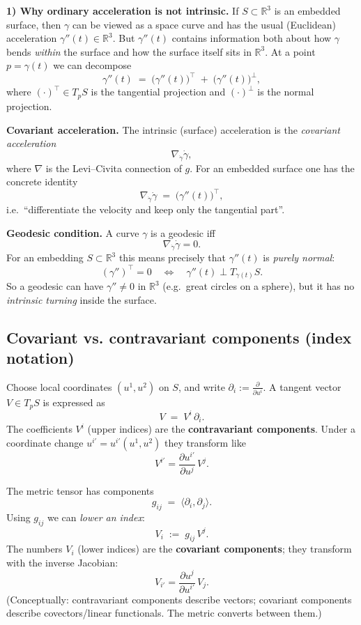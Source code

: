 \documentclass[12pt,a4paper]{article}
\theoremstyle{plain}
\theoremstyle{definition}      %
\begin{document}
\medskip
\textbf{1) Why ordinary acceleration is not intrinsic.}
If $S\subset \mathbb{R}^3$ is an embedded surface, then $\gamma$ can be viewed as a space curve and has the usual
(Euclidean) acceleration $\gamma''(t)\in \mathbb{R}^3$. But $\gamma''(t)$ contains information both about how
$\gamma$ bends \emph{within} the surface and how the surface itself sits in $\mathbb{R}^3$.
At a point $p=\gamma(t)$ we can decompose
\[
\gamma''(t) \;=\; \bigl(\gamma''(t)\bigr)^{\top} \;+\; \bigl(\gamma''(t)\bigr)^{\perp},
\]
where $(\cdot)^{\top}\in T_pS$ is the tangential projection and $(\cdot)^{\perp}$ is the normal projection.

\medskip
\textbf{Covariant acceleration.}
The intrinsic (surface) acceleration is the \emph{covariant acceleration}
\[
\nabla_{\dot\gamma}\dot\gamma,
\]
where $\nabla$ is the Levi--Civita connection of $g$.
For an embedded surface one has the concrete identity
\[
\nabla_{\dot\gamma}\dot\gamma \;=\; \bigl(\gamma''(t)\bigr)^{\top},
\]
i.e.\ ``differentiate the velocity and keep only the tangential part''.

\medskip
\textbf{Geodesic condition.}
A curve $\gamma$ is a geodesic iff
\[
\nabla_{\dot\gamma}\dot\gamma=0.
\]
For an embedding $S\subset\mathbb{R}^3$ this means precisely that $\gamma''(t)$ is \emph{purely normal}:
\[
(\gamma'')^{\top}=0 \quad\Longleftrightarrow\quad \gamma''(t)\perp T_{\gamma(t)}S.
\]
So a geodesic can have $\gamma''\neq 0$ in $\mathbb{R}^3$ (e.g.\ great circles on a sphere), but it has no
\emph{intrinsic turning} inside the surface.

\subsection*{Covariant vs. contravariant components (index notation)}

Choose local coordinates $(u^1,u^2)$ on $S$, and write $\partial_i:=\frac{\partial}{\partial u^i}$.
A tangent vector $V\in T_pS$ is expressed as
\[
V \;=\; V^i\,\partial_i.
\]
The coefficients $V^i$ (upper indices) are the \textbf{contravariant components}. Under a coordinate change
$u^{i'}=u^{i'}(u^1,u^2)$ they transform like
\[
V^{i'}=\frac{\partial u^{i'}}{\partial u^{j}}\,V^{j}.
\]

The metric tensor has components
\[
g_{ij} \;=\; \langle \partial_i,\partial_j\rangle.
\]
Using $g_{ij}$ we can \emph{lower an index}:
\[
V_i \;:=\; g_{ij}\,V^j.
\]
The numbers $V_i$ (lower indices) are the \textbf{covariant components}; they transform with the inverse Jacobian:
\[
V_{i'}=\frac{\partial u^{j}}{\partial u^{i'}}\,V_j.
\]
(Conceptually: contravariant components describe vectors; covariant components describe covectors/linear functionals.
The metric converts between them.)
\end{document}
